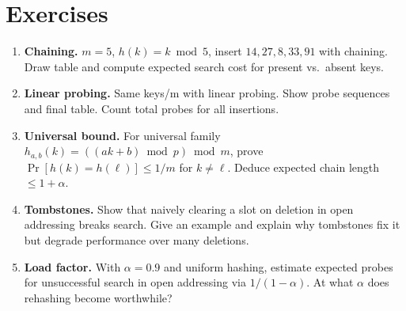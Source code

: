 \section{Exercises}
\label{sec:ch06-exercises}
\begin{enumerate}[label=E6.\arabic*, leftmargin=*, itemsep=0.7em]
    \item \textbf{Chaining.} $m=5$, $h(k)=k\bmod5$, insert $14,27,8,33,91$ with chaining. Draw table and compute expected search cost for present vs.\ absent keys.
    \item \textbf{Linear probing.} Same keys/m with linear probing. Show probe sequences and final table. Count total probes for all insertions.
    \item \textbf{Universal bound.} For universal family $h_{a,b}(k)=((ak+b)\bmod p)\bmod m$, prove $\Pr[h(k)=h(\ell)]\le1/m$ for $k\neq\ell$. Deduce expected chain length $\le1+\alpha$.
    \item \textbf{Tombstones.} Show that naively clearing a slot on deletion in open addressing breaks search. Give an example and explain why tombstones fix it but degrade performance over many deletions.
    \item \textbf{Load factor.} With $\alpha=0.9$ and uniform hashing, estimate expected probes for unsuccessful search in open addressing via $1/(1-\alpha)$. At what $\alpha$ does rehashing become worthwhile?
\end{enumerate}
